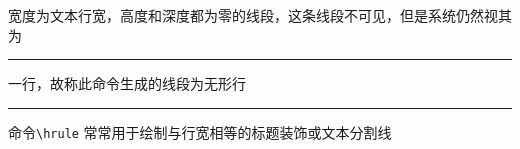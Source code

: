 \documentclass{ctexart}
\begin{document}
宽度为文本行宽，高度和深度都为零的线段，这条线段不可见，但是系统仍然视其为\hrule height 0pt 一行，故称此命令生成的线段为无形行

\hrule
命令\verb|\hrule| 常常用于绘制与行宽相等的标题装饰或文本分割线
\end{document}
